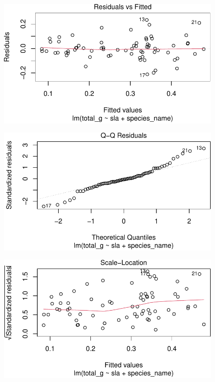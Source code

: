 \documentclass[
  letterpaper,
  DIV=11,
  numbers=noendperiod]{scrartcl}
\begin{document}
\begin{figure}[H]

{\centering \includegraphics{Odile_Gabbiani_homework-03_files/figure-pdf/unnamed-chunk-10-1.pdf}

}

\end{figure}

\begin{figure}[H]

{\centering \includegraphics{Odile_Gabbiani_homework-03_files/figure-pdf/unnamed-chunk-10-2.pdf}

}

\end{figure}

\begin{figure}[H]

{\centering \includegraphics{Odile_Gabbiani_homework-03_files/figure-pdf/unnamed-chunk-10-3.pdf}

}

\end{figure}
\end{document}

